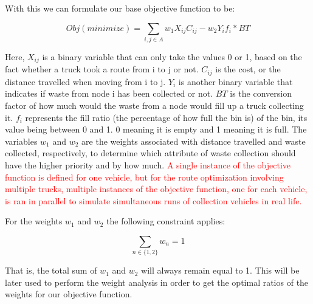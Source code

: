 \documentclass[12pt]{article}
\begin{document}
With this we can formulate our base objective function to be:

\begin{equation}\label{eq1}
    Obj(minimize)=\sum_{i,j \in A} w_1 X_{ij} C_{ij} - w_2 Y_i f_i * BT
\end{equation}

Here, $X_{ij}$ is a binary variable that can only take the values 0 or 1, based on the fact whether a truck took a route from i to j or not. $C_{ij}$ is the cost, or the distance travelled when moving from i to j. $Y_{i}$ is another binary variable that indicates if waste from node i has been collected or not. $BT$ is the conversion factor of how much would the waste from a node would fill up a truck collecting it. $f_i$ represents the fill ratio (the percentage of how full the bin is) of the bin, its value being between 0 and 1. 0 meaning it is empty and 1 meaning it is full. The variables $w_1$ and $w_2$ are the weights associated with distance travelled and waste collected, respectively, to determine which attribute of waste collection should have the higher priority and by how much. \textcolor{red}{A single instance of the objective function is defined for one vehicle, but for the route optimization involving multiple trucks, multiple instances of the objective function, one for each vehicle, is ran in parallel to simulate simultaneous runs of collection vehicles in real life.}

For the weights $w_1$ and $w_2$ the following constraint applies:

\begin{equation}\label{eq1.5}
    \sum_{n\in \{1,2\}} w_n = 1
\end{equation}

That is, the total sum of $w_1$ and $w_2$ will always remain equal to 1. This will be later used to perform the weight analysis in order to get the optimal ratios of the weights for our objective function.
\end{document}
